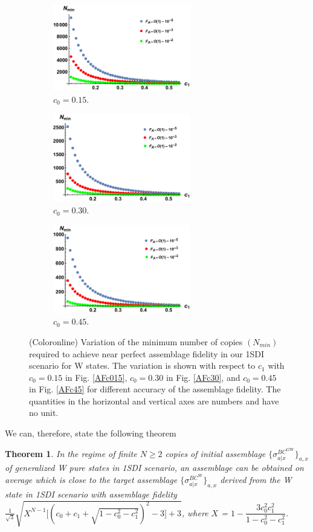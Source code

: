 \documentclass[reprint,superscriptaddress,nofootinbib,amsmath,amssymb,aps,pra,longbibliography]{revtex4-1}
\newtheorem{thm}{Theorem}
\begin{document}
\begin{figure}
   \begin{subfigure}{6cm}
   \centering\includegraphics[width=6cm]{N_min_c015.pdf}
    \caption{\footnotesize $c_0=0.15$.}
    \label{c015}
  \end{subfigure}%
  \begin{subfigure}{6cm}
    \centering\includegraphics[width=6cm]{N_min_c030.pdf}
    \caption{\footnotesize $c_0=0.30$.}
    \label{c30}
  \end{subfigure}%
   \begin{subfigure}{6cm}
    \centering\includegraphics[width=6cm]{N_min_c045.pdf}
    \caption{\footnotesize $c_0=0.45$.}
    \label{c45}
  \end{subfigure}%
\caption{\footnotesize (Coloronline) Variation of the minimum number of copies $(N_{min})$ required to achieve near perfect assemblage fidelity in our 1SDI scenario for W states.
 The variation is shown with respect to $c_1$ with $c_0 = 0.15$ in Fig. \ref{AFc015}, $c_0 = 0.30$ in Fig. \ref{AFc30},
and $c_0 = 0.45$ in Fig. \ref{AFc45} for different accuracy of the assemblage fidelity. The quantities in the horizontal and vertical axes are numbers and have no unit.}
\label{N_min_w}
\end{figure}

We can, therefore, state the following theorem
\begin{thm}
In the regime of finite $N \geq 2$ copies of initial assemblage $\{\sigma_{a|x}^{BC^{\text{GW}}}\}_{a,x}$ of generalized W pure states in 1SDI scenario, an assemblage can
be obtained on average which is close to the target assemblage $\{\sigma_{a|x}^{BC^{\text{W}}}\}_{a,x}$ derived from the W state in 1SDI scenario with assemblage fidelity $\frac{1}{\sqrt{3}} \sqrt{X^{N-1}  \Big[ (c_0 + c_1 + \sqrt{1- c_0^2 - c_1^2})^2 -3 \Big] + 3}$, where $X$ = $1-\dfrac{3 c_0^2 c_1^2}{ 1-c_0^2-c_1^2}$.
\end{thm}
\end{document}
